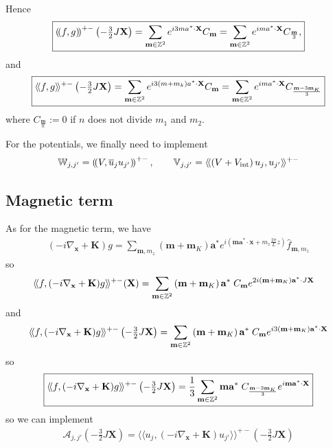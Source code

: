 \documentclass[11pt,a4paper,reqno,french,tikz]{amsart}
\newcommand\cA{\mathcal{A}}\newcommand\cB{\mathcal{B}}\newcommand\cC{\mathcal{C}}\newcommand\cD{\mathcal{D}}\newcommand\cE{\mathcal{E}}\newcommand\cF{\mathcal{F}}\newcommand\cG{\mathcal{G}}\newcommand\cH{\mathcal{H}}\newcommand\cI{\mathcal{I}}\newcommand\cJ{\mathcal{J}}\newcommand\cK{\mathcal{K}}\newcommand\cL{\mathcal{L}}\newcommand\cM{\mathcal{M}}\newcommand\cN{\mathcal{N}}\newcommand\cO{\mathcal{O}}\newcommand\cP{\mathcal{P}}\newcommand\cQ{\mathcal{Q}}\newcommand\cR{\mathcal{R}}\newcommand\cS{\mathcal{S}}\newcommand\cT{\mathcal{T}}\newcommand\cU{\mathcal{U}}\newcommand\cV{\mathcal{V}}\newcommand\cW{\mathcal{W}}\newcommand\cX{\mathcal{X}}\newcommand\cY{\mathcal{Y}}\newcommand\cZ{\mathcal{Z}}
\newcommand{\pa}[1]{\left( #1 \right)} %
\newcommand{\na}{\nabla} %
\newcommand{\f}[2]{\frac{#1}{#2}} %
\newcommand{\ind}[1]{_{\textup{#1}}} %
\newcommand{\bbV}{\mathbb{V}}
\newcommand{\db}[1]{\left(\!\left( #1 \right)\!\right)}
\def\bX{{\mathbf X}}
\def\ba{{\mathbf a}}
\def\bx{{\mathbf x}}
\def\bmm{{\mathbf m}}
\def\bK{{\mathbf K}}
\def\bbV{{\mathbb V}}
\def\bbW{{\mathbb W}}
\def\lAngle{\langle\!\langle}
\def\rAngle{\rangle\!\rangle}
\begin{document}
Hence
\begin{align*}
	\boxed{\db{f,g}^{+-}\pa{-\tfrac{3}{2} J \bX} =  \sum_{\bmm \in \Z^2} e^{i 3 ma^* \cdot \bX} C_\bmm=  \sum_{\bmm \in \Z^2} e^{i m a^* \cdot \bX} C_{\f{\bmm}{3}},}
	\end{align*}
	and
\begin{align*}
\boxed{\lAngle f,g \rAngle^{+-}\pa{-\tfrac{3}{2} J\bX} =  \sum_{\bmm \in \Z^2} e^{i 3 \pa{m+m_k}a^* \cdot \bX} C_\bmm =  \sum_{\bmm \in \Z^2} e^{i m a^* \cdot \bX} C_{\f{\bmm-3\bmm_K}{3}}}
\end{align*}
where $C_{\f{\bmm}{n}} :=  0$ if $n$ does not divide $m_1$ and $m_2$. 

For the potentials, we finally need to implement
\begin{align*}
\bbW_{j,j'} = \db{V, \overline{u}_j u_{j'}}^{+-}, \qquad \bbV_{j,j'} = \lAngle \pa{V+V\ind{int}} u_j , u_{j'} \rAngle^{+-}
\end{align*}

\subsection{Magnetic term}%
\label{sub:magnetic_term}


As for the magnetic term, we have
\begin{align*}
\pa{-i\na_\bx + \bK} g = \sum_{\bmm,m_z} \pa{\bmm + \bmm_K} \ba^* e^{i\pa{\bmm \ba^* \cdot \bx + m_z \f{2\pi}L z}} \widehat{f}_{\bmm,m_z}
\end{align*}
so
\begin{align*}
	\lAngle &f, (-i\nabla_\bx+\bK) g \rAngle^{+-}(\bX) =  \sum_{\bmm \in \Z^2} \pa{\bmm + \bmm_K}\ba^* \; C_\bmm e^{2i \pa{\bmm + \bmm_K} \ba^* \cdot J\bX} 
\end{align*}
and
\begin{align*}
\lAngle f, (-i\nabla_\bx+\bK) g \rAngle^{+-}\pa{-\tfrac{3}{2}J\bX} =  \sum_{\bmm \in \Z^2} \pa{\bmm + \bmm_K}\ba^* \; C_\bmm e^{i 3 \pa{\bmm + \bmm_K} \ba^* \cdot \bX}
\end{align*}
so
\begin{align*}
\boxed{\lAngle f, (-i\nabla_\bx+\bK) g \rAngle^{+-}\pa{-\tfrac{3}{2}J\bX} = \f {1}3 \sum_{\bmm \in \Z^2} \bmm \ba^* \; C_{\f{\bmm - 3\bmm_K}{3}} e^{i \bmm \ba^* \cdot \bX} }
\end{align*}
so we can implement
\begin{align*}
\bm{\cA}_{j,j'}\pa{-\tfrac{3}{2}J\bX} = \lAngle u_j, (-i\nabla_\bx+\bK) u_{j'} \rAngle^{+-}\pa{-\tfrac{3}{2}J\bX}
\end{align*}
\end{document}
